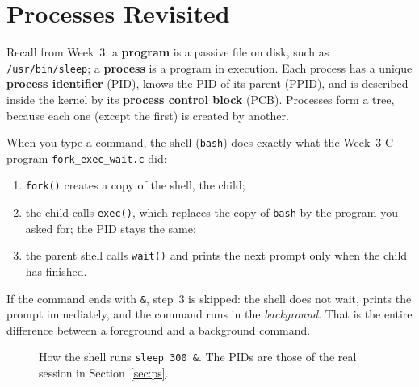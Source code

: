 \documentclass[11pt,a4paper]{article}
\newcommand{\term}[1]{\textbf{\color{mintdeep}#1}}
\newcommand{\cmd}[1]{\texttt{#1}}
\begin{document}
\section{Processes Revisited}
\label{sec:revisit}

Recall from Week~3: a \term{program} is a passive file on disk, such as \texttt{/usr/bin/sleep}; a \term{process} is a program in execution. Each process has a unique \term{process identifier} (PID), knows the PID of its parent (PPID), and is described inside the kernel by its \term{process control block} (PCB). Processes form a tree, because each one (except the first) is created by another.

When you type a command, the shell (\cmd{bash}) does exactly what the Week~3 C program \texttt{fork\_exec\_wait.c} did:
\begin{enumerate}[leftmargin=1.4em]
  \item \cmd{fork()} creates a copy of the shell, the child;
  \item the child calls \cmd{exec()}, which replaces the copy of \cmd{bash} by the program you asked for; the PID stays the same;
  \item the parent shell calls \cmd{wait()} and prints the next prompt only when the child has finished.
\end{enumerate}
If the command ends with \texttt{\&}, step~3 is skipped: the shell does not wait, prints the prompt immediately, and the command runs in the \emph{background}. That is the entire difference between a foreground and a background command.

\begin{figure}[H]
\centering
{}
\caption{How the shell runs \texttt{sleep 300 \&}. The PIDs are those of the real session in Section~\ref{sec:ps}.}
\end{figure}
\end{document}
